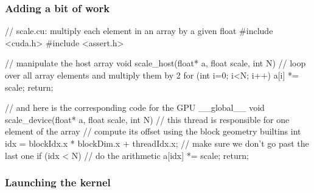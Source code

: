 \begin{frame}[fragile]
%
  \frametitle{Adding a bit of work}
  \label{slide:hello-world-cuda}
%
  \begin{C}
// scale.cu: multiply each element in an array by a given float
#include <cuda.h>
#include <assert.h>

// manipulate the host array
void scale_host(float* a, float scale, int N) {
    // loop over all array elements and multiply them by 2 
    for (int i=0; i<N; i++) {
        a[i] *= scale;
    }
    return;
}

// and here is the corresponding code for the GPU
__global__ void scale_device(float* a, float scale, int N) {
    // this thread is responsible for one element of the array
    // compute its offset using the block geometry builtins
    int idx = blockIdx.x * blockDim.x  + threadIdx.x;
    // make sure we don't go past the last one
    if (idx < N) {
        // do the arithmetic
        a[idx] *= scale;
    }
    return;
}
  \end{C}
%
\end{frame}

\begin{frame}[fragile]
%
  \frametitle{Launching the kernel}
  \label{slide:launching-kernel-cuda}
%
%
\end{frame}

